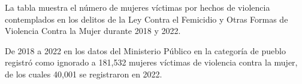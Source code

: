 La tabla muestra el número de mujeres víctimas por hechos de violencia contemplados en los delitos de la Ley Contra el Femicidio y Otras Formas de Violencia Contra la Mujer durante 2018 y 2022. 

De 2018 a 2022 en los datos del Ministerio Público en la categoría de pueblo registró como ignorado a 181,532 mujeres víctimas de violencia contra la mujer, de los cuales 40,001 se registraron en 2022. 